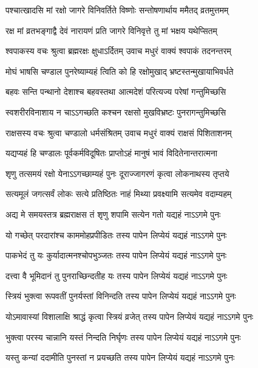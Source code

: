 \twolineshloka
{पश्चात्खादसि मां रक्षो जागरे विनिवर्तिते}
{विष्णोः सन्तोषणार्थाय ममैतद् व्रतमुत्तमम्}%

\twolineshloka
{रक्ष मां व्रतभङ्गाद्वै देवं नारायणं प्रति}
{जागरे विनिवृत्ते तु मां भक्षय यथेप्सितम्}%

\twolineshloka
{श्वपाकस्य वचः श्रुत्वा ब्रह्मरक्षः क्षुधाऽर्दितम्}
{उवाच मधुरं वाक्यं श्वपाकं तदनन्तरम्}%

\twolineshloka
{मोघं भाषसि चण्डाल पुनरेष्याम्यहं त्विति}
{को हि रक्षोमुखाद् भ्रष्टस्तन्मुखायाभिवर्धते}%

\twolineshloka
{बहवः सन्ति पन्थानो देशाश्च बहवस्तथा}
{आत्मदेशं परित्यज्य परेषां गन्तुमिच्छसि}%

\twolineshloka
{स्वशरीरविनाशाय न चाऽऽगच्छति कश्चन}
{रक्षसो मुखविभ्रष्टः पुनरागन्तुमिच्छसि}%

\twolineshloka
{राक्षसस्य वचः श्रुत्वा चण्डालो धर्मसंश्रितम्}
{उवाच मधुरं वाक्यं राक्षसं पिशिताशनम्}%

\twolineshloka
{यद्यप्यहं हि चण्डालः पूर्वकर्मविदूषितः}
{प्राप्तोऽहं मानुषं भावं विदितेनान्तरात्मना}%

\twolineshloka
{शृणु तत्समयं रक्षो येनाऽऽगच्छाम्यहं पुनः}
{दूराज्जागरणं कृत्वा लोकनाथस्य तृप्तये}%

\twolineshloka
{सत्यमूलं जगत्सर्वं लोकः सत्ये प्रतिष्ठितः}
{नाहं मिथ्या प्रवक्ष्यामि सत्यमेव वदाम्यहम्}%

\twolineshloka
{अद्य मे समयस्तत्र ब्रह्मराक्षस तं शृणु}
{शपामि सत्येन गतो यद्यहं नाऽऽगमे पुनः}%

\twolineshloka
{यो गच्छेत् परदारांश्च काममोहप्रपीडितः}
{तस्य पापेन लिप्येयं यद्यहं नाऽऽगमे पुनः}%

\twolineshloka
{पाकभेदं तु यः कुर्यादात्मनश्चोपभुञ्जतः}
{तस्य पापेन लिप्येयं यद्यहं नाऽऽगमे पुनः}%

\twolineshloka
{दत्त्वा वै भूमिदानं तु पुनराच्छिन्दतीह यः}
{तस्य पापेन लिप्येयं यद्यहं नाऽऽगमे पुनः}%

\twolineshloka
{स्त्रियं भुक्त्वा रूपवतीं पुनर्यस्तां विनिन्दति}
{तस्य पापेन लिप्येयं यद्यहं नाऽऽगमे पुनः}%

\twolineshloka
{योऽमावास्यां विशालाक्षि श्राद्धं कृत्वा स्त्रियं व्रजेत्}
{तस्य पापेन लिप्येयं यद्यहं नाऽऽगमे पुनः}%

\twolineshloka
{भुक्त्वा परस्य चान्नानि यस्तं निन्दति निर्घृणः}
{तस्य पापेन लिप्येयं यद्यहं नाऽऽगमे पुनः}%

\twolineshloka
{यस्तु कन्यां ददामीति पुनस्तां न प्रयच्छति}
{तस्य पापेन लिप्येयं यद्यहं नाऽऽगमे पुनः}%

